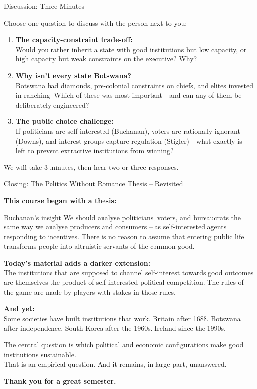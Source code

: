 \documentclass[10pt]{beamer}
\begin{document}
\begin{frame}{Discussion: Three Minutes}

\begin{block}{Choose one question to discuss with the person next to you:}

\begin{enumerate}
\item \textbf{The capacity-constraint trade-off:}\\
Would you rather inherit a state with good institutions but low capacity, or high capacity but weak constraints on the executive? Why?


\item \textbf{Why isn't every state Botswana?}\\
Botswana had diamonds, pre-colonial constraints on chiefs, and elites invested in ranching. Which of these was most important - and can any of them be deliberately engineered?


\item \textbf{The public choice challenge:}\\
If politicians are self-interested (Buchanan), voters are rationally ignorant (Downs), and interest groups capture regulation (Stigler) - what exactly is left to prevent extractive institutions from winning?
\end{enumerate}
\end{block}


\footnotesize We will take 3 minutes, then hear two or three responses.
\end{frame}

\begin{frame}[allowframebreaks]{Closing: The Politics Without Romance Thesis -- Revisited}

\textbf{This course began with a thesis:}


\begin{block}{Buchanan's insight}
We should analyse politicians, voters, and bureaucrats the same way we analyse producers and consumers -- as self-interested agents responding to incentives. There is no reason to assume that entering public life transforms people into altruistic servants of the common good.
\end{block}


\textbf{Today's material adds a darker extension:}\\
The institutions that are supposed to channel self-interest towards good outcomes are themselves the product of self-interested political competition. The rules of the game are made by players with stakes in those rules.


\textbf{And yet:}\\
Some societies have built institutions that work. Britain after 1688. Botswana after independence. South Korea after the 1960s. Ireland since the 1990s.


\alert{The central question is which political and economic configurations make good institutions sustainable.}\\[4pt]
That is an empirical question. And it remains, in large part, unanswered.


\textbf{Thank you for a great semester.}
\end{frame}
\end{document}
